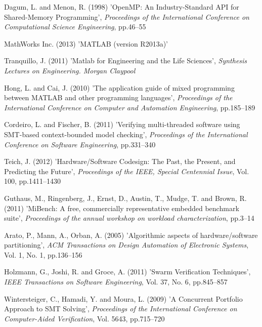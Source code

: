 \documentclass{doublecol-new}
\theoremstyle{TH}{
\newtheorem{lemma}{Lemma}
\newtheorem{theorem}[lemma]{Theorem}
\newtheorem{corrolary}[lemma]{Corrolary}
\newtheorem{conjecture}[lemma]{Conjecture}
\newtheorem{proposition}[lemma]{Proposition}
\newtheorem{claim}[lemma]{Claim}
\newtheorem{stheorem}[lemma]{Wrong Theorem}
\newtheorem{algorithm}{Algorithm}
}
\theoremstyle{THrm}{
\newtheorem{definition}{Definition}[section]
\newtheorem{question}{Question}[section]
\newtheorem{remark}{Remark}
\newtheorem{scheme}{Scheme}
}
\theoremstyle{THhit}{
\newtheorem{case}{Case}[section]
}
\begin{document}
\begin{thebibliography}{10}
Dagum, L. and Menon, R. (1998) 'OpenMP: An Industry-Standard API for Shared-Memory Programming', {\it Proceedings of the International Conference on Computational Science Engineering}, pp.46--55

MathWorks Inc. (2013) 'MATLAB (version R2013a)'

Tranquillo, J. (2011) 'Matlab for Engineering and the Life Sciences', {\it Synthesis Lectures on Engineering. Morgan Claypool}

Hong, L. and Cai, J. (2010) 'The application guide of mixed programming between MATLAB and other programming languages', {\it Proceedings of the International Conference on Computer and Automation Engineering}, pp.185--189

Cordeiro, L. and Fischer, B. (2011) 'Verifying multi-threaded software using SMT-based context-bounded model checking', {\it Proceedings of the International Conference on Software Engineering}, pp.331--340

Teich, J. (2012) 'Hardware/Software Codesign: The Past, the Present, and Predicting the Future', {\it Proceedings of the IEEE, Special Centennial Issue}, Vol. 100, pp.1411--1430

Guthaus, M., Ringenberg, J., Ernst, D., Austin, T., Mudge, T. and Brown, R. (2011) 'MiBench: A free, commercially representative embedded benchmark suite', {\it Proceedings of the annual workshop on workload characterization}, pp.3--14

Arato, P., Mann, A., Orban, A. (2005) 'Algorithmic aspects of hardware/software partitioning', {\it ACM Transactions on Design Automation of Electronic Systems}, Vol. 1, No. 1, pp.136--156

Holzmann, G., Joshi, R. and Groce, A. (2011) 'Swarm Verification Techniques', {\it IEEE Transactions on Software Engineering}, Vol. 37, No. 6, pp.845--857

Wintersteiger, C., Hamadi, Y. and Moura, L. (2009) 'A Concurrent Portfolio Approach to SMT Solving', {\it Proceedings of the International Conference on Computer-Aided Verification}, Vol. 5643, pp.715--720


\end{thebibliography}
\end{document}
